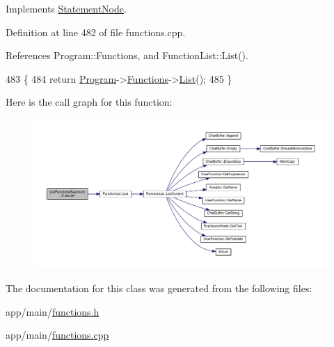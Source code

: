 Implements \hyperlink{classStatementNode_a721589622c930c010927b9a9c55b173e}{Statement\+Node}.



Definition at line 482 of file functions.\+cpp.



References Program\+::\+Functions, and Function\+List\+::\+List().


\begin{DoxyCode}
483 \{
484     \textcolor{keywordflow}{return} \hyperlink{classProgram}{Program}->\hyperlink{classProgram_ac643877adc06800a021263b2234cd236}{Functions}->\hyperlink{classFunctionList_a667bf5683f0b7332b5607781df53c728}{List}();
485 \}
\end{DoxyCode}


Here is the call graph for this function\+:
\nopagebreak
\begin{figure}[H]
\begin{center}
\leavevmode
\includegraphics[width=350pt]{da/d2e/classListFunctionsStatement_aecbd17235ded16103ebed33a8fcca90e_cgraph}
\end{center}
\end{figure}




The documentation for this class was generated from the following files\+:\begin{DoxyCompactItemize}
\item 
app/main/\hyperlink{functions_8h}{functions.\+h}\item 
app/main/\hyperlink{functions_8cpp}{functions.\+cpp}\end{DoxyCompactItemize}
